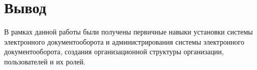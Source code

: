 \chapter{Вывод}

В рамках данной работы были получены первичные навыки установки системы электронного документооборота
и администрирования системы электронного документооборота, создания организационной структуры организации, пользователей и их ролей.